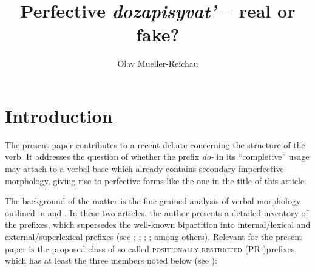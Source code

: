 \documentclass[output=paper,
colorlinks,
citecolor=brown,
newtxmath
]{langscibook}
\author{Olav Mueller-Reichau\affiliation{Leipzig University}}
\title[Perfective \textup{dozapisyvat'} -- real or fake?]
      {Perfective \textit{dozapisyvat'} -- real or fake?}
\begin{document}
\maketitle


\section{Introduction}

The present paper contributes to a recent debate concerning the structure of the  verb. It addresses the question of whether the prefix \textit{do-} in its ``completive'' usage may attach to a verbal base which already contains secondary imperfective morphology, giving rise to perfective forms like the one in the title of this article.

The background of the matter is the fine-grained analysis of  verbal morphology outlined in \citet{Tatevosov2009} and \citet{Tatevosov2013b}. In these two articles, the author presents a detailed inventory of the  prefixes, which supersedes the well-known bipartition into internal/lexical and external/super\-lexical pre\-fixes (see \citealt{Gehrke2008}; \citealt{Ramchand2004}; \citealt{Romanova2004}; \citealt{Svenonius2004}; among others). Relevant for the present paper is the proposed class of so-called \textsc{positionally restricted} (PR-)prefixes, which has at least the three members noted below (see \citealt[49]{Tatevosov2013b}):
\end{document}

